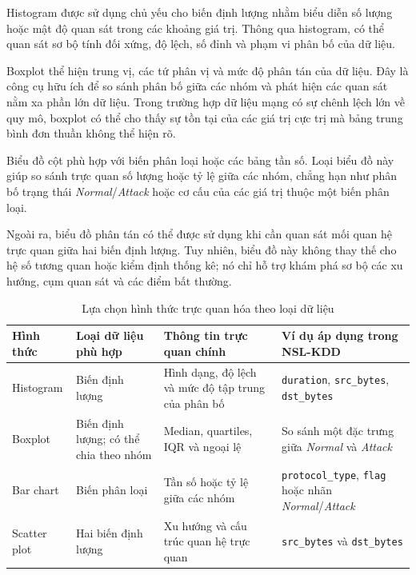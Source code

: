 \documentclass[../main.tex]{subfiles}
\begin{document}
Histogram được sử dụng chủ yếu cho biến định lượng nhằm biểu diễn số lượng hoặc mật độ quan sát trong các khoảng giá trị. Thông qua histogram, có thể quan sát sơ bộ tính đối xứng, độ lệch, số đỉnh và phạm vi phân bố của dữ liệu.

Boxplot thể hiện trung vị, các tứ phân vị và mức độ phân tán của dữ liệu. Đây là công cụ hữu ích để so sánh phân bố giữa các nhóm và phát hiện các quan sát nằm xa phần lớn dữ liệu. Trong trường hợp dữ liệu mạng có sự chênh lệch lớn về quy mô, boxplot có thể cho thấy sự tồn tại của các giá trị cực trị mà bảng trung bình đơn thuần không thể hiện rõ.

Biểu đồ cột phù hợp với biến phân loại hoặc các bảng tần số. Loại biểu đồ này giúp so sánh trực quan số lượng hoặc tỷ lệ giữa các nhóm, chẳng hạn như phân bố trạng thái \textit{Normal}/\allowbreak\textit{Attack} hoặc cơ cấu của các giá trị thuộc một biến phân loại.

Ngoài ra, biểu đồ phân tán có thể được sử dụng khi cần quan sát mối quan hệ trực quan giữa hai biến định lượng. Tuy nhiên, biểu đồ này không thay thế cho hệ số tương quan hoặc kiểm định thống kê; nó chỉ hỗ trợ khám phá sơ bộ các xu hướng, cụm quan sát và các điểm bất thường.

\begin{table}[H]
    \centering
    \caption{Lựa chọn hình thức trực quan hóa theo loại dữ liệu}
    \label{tab:t1:visual}
    \renewcommand{\arraystretch}{1.2}
    \begin{tabularx}{\textwidth}{|p{}|p{}|p{}|X|}
        \hline
        \textbf{Hình thức} &
        \textbf{Loại dữ liệu phù hợp} &
        \textbf{Thông tin trực quan chính} &
        \textbf{Ví dụ áp dụng trong NSL-KDD} \\
        \hline

        Histogram &
        Biến định lượng &
        Hình dạng, độ lệch và mức độ tập trung của phân bố &
        \texttt{duration}, \texttt{src\_bytes}, \texttt{dst\_bytes} \\
        \hline

        Boxplot &
        Biến định lượng; có thể chia theo nhóm &
        Median, quartiles, IQR và ngoại lệ &
        So sánh một đặc trưng giữa \textit{Normal} và \textit{Attack} \\
        \hline

        Bar chart &
        Biến phân loại &
        Tần số hoặc tỷ lệ giữa các nhóm &
        \texttt{protocol\_type}, \texttt{flag} hoặc nhãn \textit{Normal}/\allowbreak\textit{Attack} \\
        \hline

        Scatter plot &
        Hai biến định lượng &
        Xu hướng và cấu trúc quan hệ trực quan &
        \texttt{src\_bytes} và \texttt{dst\_bytes} \\
        \hline
    \end{tabularx}
\end{table}
\end{document}
